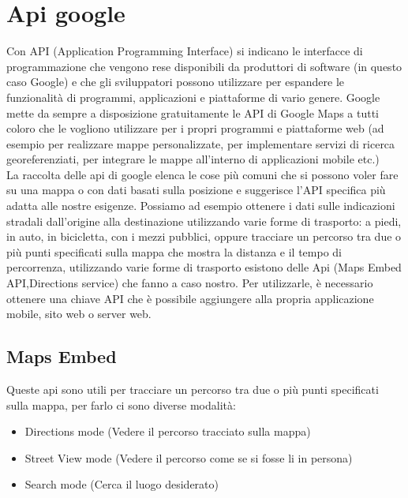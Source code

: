 \documentclass[]{scrartcl}
\begin{document}
\section{Api google}
Con API (Application Programming Interface) si indicano le interfacce di programmazione che vengono rese disponibili da produttori di software (in questo caso Google) e che gli sviluppatori possono utilizzare per espandere le funzionalità di programmi, applicazioni e piattaforme di vario genere.
Google mette da sempre a disposizione gratuitamente le API di Google Maps a tutti coloro che le vogliono utilizzare per i propri programmi e piattaforme web (ad esempio per realizzare mappe personalizzate, per implementare servizi di ricerca georeferenziati, per integrare le mappe all’interno di applicazioni mobile etc.)\\
La raccolta delle api di google elenca le cose più comuni che si possono voler fare su una mappa o con dati basati sulla posizione e suggerisce l'API specifica più adatta alle nostre esigenze. Possiamo ad esempio ottenere i dati sulle indicazioni stradali dall'origine alla destinazione utilizzando varie forme di trasporto: a piedi, in auto, in bicicletta, con i mezzi pubblici, oppure tracciare un percorso tra due o più punti specificati sulla mappa che mostra la distanza e il tempo di percorrenza, utilizzando varie forme di trasporto esistono delle Api (Maps Embed API,Directions service) che fanno a caso nostro. Per utilizzarle, è necessario ottenere una chiave API che è possibile aggiungere alla propria applicazione mobile, sito web o server web.
\subsection{Maps Embed}
Queste api sono utili per tracciare un percorso tra due o più punti specificati sulla mappa, per farlo ci sono diverse modalità: 
\begin{itemize}
\item Directions mode (Vedere il percorso tracciato sulla mappa)
\item Street View mode (Vedere il percorso come se si fosse li in persona)
\item Search mode (Cerca il luogo desiderato)
\end{itemize}
\end{document}
